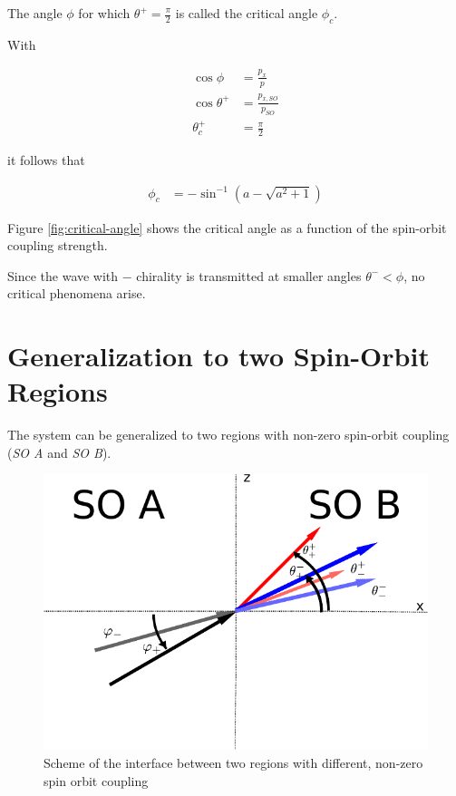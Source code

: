 The angle $\phi$ for which $\theta^+ =\frac{\pi}{2}$ is called the
critical angle $\phi_c$.

\clearpage
With

\begin{align}
    \cos \phi       &= \frac{p_x}{p}\\
    \cos \theta^+   &= \frac{p_{x,SO}}{p_{SO}}\\
    \theta_c^+      &= \frac{\pi}{2}
\end{align}

it follows that

\begin{align}
    \phi_c          &= -\sin ^{-1}\left(a-\sqrt{a^2+1}\right)
\end{align}

Figure \ref{fig:critical-angle} shows the critical angle as a function
of the spin-orbit coupling strength.

Since the wave with $-$ chirality is transmitted at smaller angles
$\theta^- < \phi$, no critical phenomena arise.

\section{Generalization to two Spin-Orbit Regions}

The system can be generalized to two regions with non-zero spin-orbit
coupling (\emph{SO A} and \emph{SO B}).

\begin{figure}[htb]
    \begin{center}
        \includegraphics{setup-two-so-regions.pdf}
    \end{center}
    \caption{Scheme of the interface between two regions with
        different, non-zero spin orbit coupling}
    \label{fig:setup-nonzero}
\end{figure}

